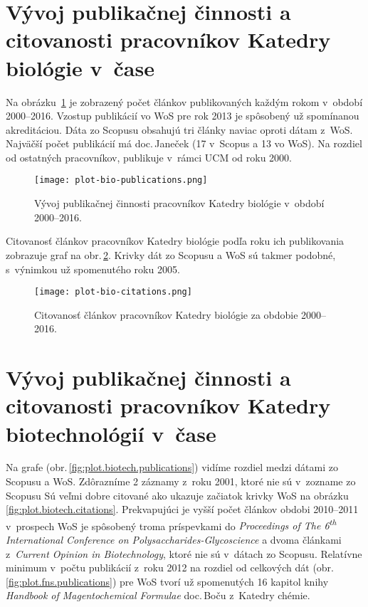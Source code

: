 \section{Vývoj publikačnej činnosti a citovanosti pracovníkov Katedry biológie
  v~čase}

Na obrázku~\ref{fig:plot.bio.publications} je zobrazený počet článkov
publikovaných každým rokom v~období 2000--2016.  Vzostup publikácií vo WoS pre
rok 2013 je spôsobený už spomínanou akreditáciou.  Dáta zo Scopusu obsahujú tri
články naviac oproti dátam z~WoS.  Najväčší počet publikácií má doc.\,Janeček
(17 v~Scopus a 13 vo WoS).  Na rozdiel od ostatných pracovníkov, publikuje
v~rámci UCM od roku 2000.

\begin{figure}
  \centering
  \texttt{[image: plot-bio-publications.png]}
  \caption{Vývoj publikačnej činnosti pracovníkov Katedry biológie v~období
    2000--2016.}
  \label{fig:plot.bio.publications}
\end{figure}

Citovanosť článkov pracovníkov Katedry biológie podľa roku ich publikovania
zobrazuje graf na obr.\,\ref{fig:plot.bio.citations}.  Krivky dát zo Scopusu a
WoS sú takmer podobné, s~výnimkou už spomenutého  roku 2005.

\begin{figure}
  \centering
  \texttt{[image: plot-bio-citations.png]}
  \caption{Citovanosť článkov pracovníkov Katedry biológie za obdobie
    2000--2016.}
  \label{fig:plot.bio.citations}
\end{figure}


\section{Vývoj publikačnej činnosti a citovanosti pracovníkov Katedry
  biotechnológií v~čase}

Na grafe (obr.\,\ref{fig:plot.biotech.publications}) vidíme rozdiel medzi dátami
zo Scopusu a WoS.  Zdôrazníme 2 záznamy z~roku 2001, ktoré nie sú v~zozname zo
Scopusu Sú veľmi dobre citované ako ukazuje začiatok krivky WoS na obrázku
\ref{fig:plot.biotech.citations}.  Prekvapujúci je vyšší počet článkov obdobi
2010--2011 v~prospech WoS je spôsobený troma príspevkami do \emph{Proceedings of
  The 6\textsuperscript{th} International Conference on
  Polysaccharides-Glycoscience} a dvoma článkami z~\emph{Current Opinion in
  Biotechnology}, ktoré nie sú v~dátach zo Scopusu.  Relatívne minimum v~počtu
publikácií z~roku 2012 na rozdiel od celkových dát
(obr.\,\ref{fig:plot.fns.publications}) pre WoS tvorí už spomenutých 16 kapitol
knihy \emph{Handbook of Magentochemical Formulae} doc.\,Boču z~Katedry chémie.

